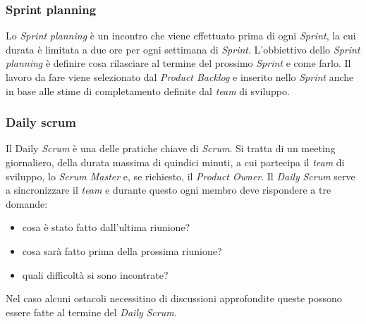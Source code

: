 \subsubsection{Sprint planning}
Lo \textit{Sprint} \textit{planning} è un incontro che viene effettuato prima di ogni \textit{Sprint}, la cui durata è limitata a due ore per ogni settimana di \textit{Sprint}. L'obbiettivo dello \textit{Sprint} \textit{planning} è definire cosa rilasciare al termine del prossimo \textit{Sprint} e come farlo.
Il lavoro da fare viene selezionato dal \textit{Product Backlog} e inserito nello \textit{Sprint} anche in base alle stime di completamento definite dal \textit{team} di sviluppo.

\subsubsection{Daily scrum}
Il Daily \textit{Scrum} è una delle pratiche chiave di \textit{Scrum}. Si tratta di un meeting giornaliero, della durata massima di quindici minuti, a cui partecipa il \textit{team} di sviluppo, lo \textit{Scrum Master} e, se richiesto, il \textit{Product Owner}. Il \textit{Daily} \textit{Scrum} serve a sincronizzare il \textit{team} e durante questo ogni membro deve rispondere a tre domande:
\begin{itemize}
    \item cosa è stato fatto dall'ultima riunione?
    \item cosa sarà fatto prima della prossima riunione?
    \item quali difficoltà si sono incontrate?
\end{itemize}
Nel caso alcuni ostacoli necessitino di discussioni approfondite queste possono essere fatte al termine del \textit{Daily} \textit{Scrum}.

